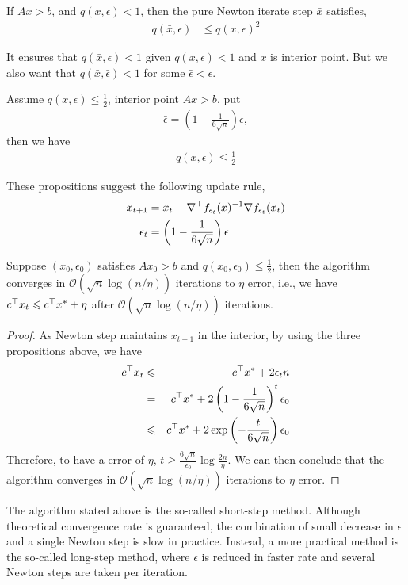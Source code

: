 \begin{proposition}\label{prop2}
If $Ax>b$, and $q(x,\epsilon)<1$, then the pure Newton iterate
step $\bar{x}$ satisfies,
\begin{align}
q(\bar{x}, \epsilon) &\leq q(x, \epsilon)^2 
\end{align}
\end{proposition}
It ensures that $q(\bar{x}, {\epsilon})<1$ given $q(x,\epsilon)<1$ and $x$ is interior point. But we also want that $q(\bar{x}, \bar{\epsilon})<1$ for some $\bar{\epsilon}<\epsilon$. 

\begin{proposition}\label{prop3}
Assume $q(x,\epsilon)\leq \frac{1}{2}$, interior point $Ax>b$,
put 
\begin{align}
\bar{\epsilon} = \left(1-\frac{1}{6\sqrt{n}}\right)\epsilon,
\end{align}
then we have
\begin{align}
q(\bar{x}, \bar{\epsilon})\leq \frac{1}{2}
\end{align}
\end{proposition}
These propositions suggest the following update rule,
\begin{align}
x_{t+1} & = x_t - \nabla^\top f_{\epsilon_t}(x)^{-1}\nabla f_{\epsilon_t}(x_t) \\
\epsilon_t & = \left(1-\frac{1}{6\sqrt{n}}\right)\epsilon
\end{align}
\begin{theorem}
Suppose $(x_0, \epsilon_0)$ satisfies $Ax_0 >b$ and 
$q(x_0,\epsilon_0)\leq\frac{1}{2}$, then the algorithm
converges in $\mathcal{O}(\sqrt{n}\log(n/\eta))$ iterations to $\eta$ error, i.e., we have $c^\top x_t\leqslant{c^\top x^*+\eta}$ after $\mathcal{O}(\sqrt{n}\log(n/\eta))$ iterations.
\end{theorem}

\begin{proof}
As Newton step maintains $x_{t+1}$ in the interior, by using the three propositions above, we have 
\begin{eqnarray}
c^\top x_t&\leqslant&{c^\top x^*+2\epsilon_t{n}}\nonumber\\
&=&{c^\top x^*+2\left(1-\frac{1}{6\sqrt{n}}\right)^t\epsilon_0}\nonumber\\
&\leqslant&{c^\top x^*+2\exp\left(-\frac{t}{6\sqrt{n}}\right)\epsilon_0}
\end{eqnarray}
Therefore, to have a error of $\eta$, $t\geqslant{\frac{6\sqrt{n}}{\epsilon_0}}\log{\frac{2n}{\eta}}$. We can then conclude that the algorithm converges in  $\mathcal{O}(\sqrt{n}\log(n/\eta))$ iterations to $\eta$ error. 
\end{proof}

The algorithm stated above is the so-called short-step method. Although theoretical convergence rate is guaranteed, the combination of small decrease in $\epsilon$ and a single Newton step is slow in practice. Instead, a more practical method is the so-called long-step method, where $\epsilon$ is reduced in faster rate and several Newton steps are taken per iteration.

